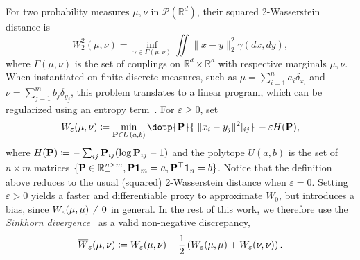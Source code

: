 For two probability measures $\mu, \nu$ in $\mathcal{P}(\mathbb{R}^d)$, their squared 2-Wasserstein distance is
\begin{equation} \label{eq:ot}
    W_2^2(\mu, \nu) = \inf_{\gamma\in \Gamma(\mu,\nu)}\iint \|x-y\|^2_2 \gamma(dx, dy),
\end{equation}
where $\Gamma(\mu, \nu)$ is the set of couplings on $\mathbb{R}^d\times\mathbb{R}^d$ with respective marginals $\mu, \nu$. When instantiated on finite discrete measures, such as $\mu=\sum_{i=1}^n a_i\delta_{x_i}$ and $\nu=\sum_{j=1}^m b_j\delta_{y_j}$, this problem translates to a linear program, which can be regularized using an entropy term~\citep{cuturi2013sinkhorn,peyre2019computational}. For $\varepsilon\geq0$, set 
\begin{equation}\label{eq:reg-ot}
\We(\mu,\nu) \defeq \min_{\bP\in U(a,b)} \dotp{\bP}{[\|x_i - y_j\|^2]_{ij}}  \,-\varepsilon H(\bP),
\end{equation}
where $H(\mathbf{P}) \coloneqq -\sum_{ij} \mathbf{P}_{ij} (\log \mathbf{P}_{ij} - 1)$ and the polytope $U(a,b)$ is the set of $n\times m$ matrices $\{\mathbf{P}\in\mathbb{R}^{n \times m}_+, \mathbf{P}\mathbf{1}_m =a, \mathbf{P}^\top\mathbf{1}_n=b\}$. 
Notice that the definition above reduces to the usual (squared) 2-Wasserstein distance when $\varepsilon=0$. Setting $\varepsilon>0$ yields a faster and differentiable proxy to approximate $W_{0}$, but introduces a bias, since $W_{\varepsilon}(\mu,\mu)\ne 0$ in general. %
In the rest of this work, we therefore use the \textit{Sinkhorn divergence}~\citep{ramdas2017wasserstein,genevay2018sample,salimans2018improving,feydy2018interpolating} as %
a valid non-negative discrepancy,
\begin{equation} \label{eq:sinkhorn}
\overline{W}_{\varepsilon}(\mu,\nu) \coloneqq W_{\varepsilon}(\mu,\nu)-\frac{1}{2}\left(W_{\varepsilon}(\mu,\mu)+W_{\varepsilon}(\nu,\nu)\right).\\
\end{equation}

